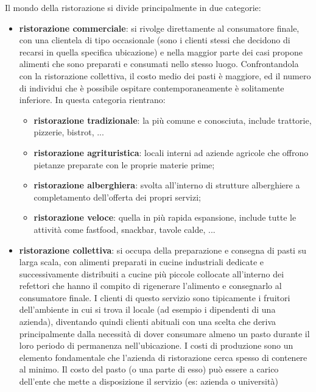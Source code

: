 \documentclass[a4paper, titlepage, 12pt, openright, twoside]{book}
\begin{document}
Il mondo della ristorazione si divide principalmente in due categorie:
\begin{itemize}
	\item \textbf{ristorazione commerciale}: si rivolge direttamente al consumatore finale, con una clientela di tipo occasionale
											 (sono i clienti stessi che decidono di recarsi in quella specifica ubicazione) e nella maggior parte dei casi
											 propone alimenti che sono preparati e consumati nello stesso luogo. Confrontandola con la ristorazione collettiva,
											 il costo medio dei pasti è maggiore, ed il numero di individui che è possibile ospitare contemporaneamente è solitamente inferiore.
											 In questa categoria rientrano:
											 \begin{itemize}
											 	\item \textbf{ristorazione tradizionale}: la più comune e conosciuta, include trattorie, pizzerie, bistrot, ...
											 	\item \textbf{ristorazione agrituristica}: locali interni ad aziende agricole che offrono pietanze preparate con le proprie materie prime;
											 	\item \textbf{ristorazione alberghiera}: svolta all'interno di strutture alberghiere a completamento dell'offerta dei propri servizi;
											 	\item \textbf{ristorazione veloce}: quella in più rapida espansione, include tutte le attività 
											 										come fastfood, snackbar, tavole calde, ...
											 \end{itemize}
	\item \textbf{ristorazione collettiva}: si occupa della preparazione e consegna di pasti su larga scala, con alimenti preparati in cucine industriali dedicate e
											successivamente distribuiti a cucine più piccole collocate all'interno dei refettori che hanno il compito di rigenerare l'alimento
											e consegnarlo al consumatore finale. I clienti di questo servizio sono tipicamente i fruitori dell'ambiente in cui si trova il locale
											(ad esempio i dipendenti di una azienda), diventando quindi clienti abituali con una scelta che deriva principalmente 
											dalla necessità di dover consumare almeno un pasto durante il loro periodo di permanenza nell'ubicazione. 
											I costi di produzione sono un elemento fondamentale che l'azienda di ristorazione cerca spesso di contenere al minimo.
											Il costo del pasto (o una parte di esso) può essere a carico dell'ente che mette a disposizione il servizio (es: azienda o università)

\end{itemize}
\end{document}
